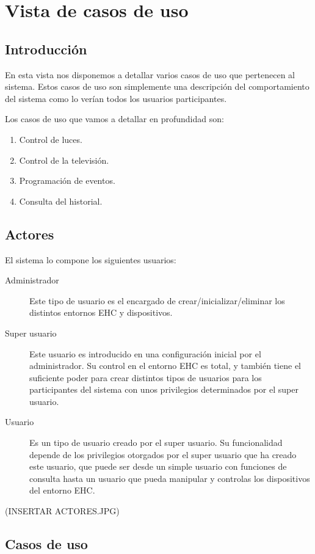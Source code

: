 \chapter{Vista de casos de uso}
\section{Introducci\'on}
En esta vista nos disponemos a detallar varios casos de uso que pertenecen al sistema. Estos casos de uso son simplemente una descripci\'on del comportamiento del sistema como lo ver\'ian todos los usuarios participantes.

Los casos de uso que vamos a detallar en profundidad son:
\begin{enumerate}
\item Control de luces.
\item Control de la televisi\'on.
\item Programaci\'on de eventos.
\item Consulta del historial.
\end{enumerate}

\section{Actores}
El sistema lo compone los siguientes usuarios:
\begin{description}
\item[Administrador] Este tipo de usuario es el encargado de crear/inicializar/eliminar los distintos entornos EHC y dispositivos.
\item[Super usuario] Este usuario es introducido en una configuraci\'on inicial por el administrador. Su control en el entorno EHC es total, y tambi\'en tiene el suficiente poder para crear distintos tipos de usuarios para los participantes del sistema con unos privilegios determinados por el super usuario. 
\item[Usuario] Es un tipo de usuario creado por el super usuario. Su funcionalidad depende de los privilegios otorgados por el super usuario que ha creado este usuario, que puede ser desde un simple usuario con funciones de consulta hasta un usuario que pueda manipular y controlas los dispositivos del entorno EHC.
\end{description}

(INSERTAR ACTORES.JPG)

\section{Casos de uso}
